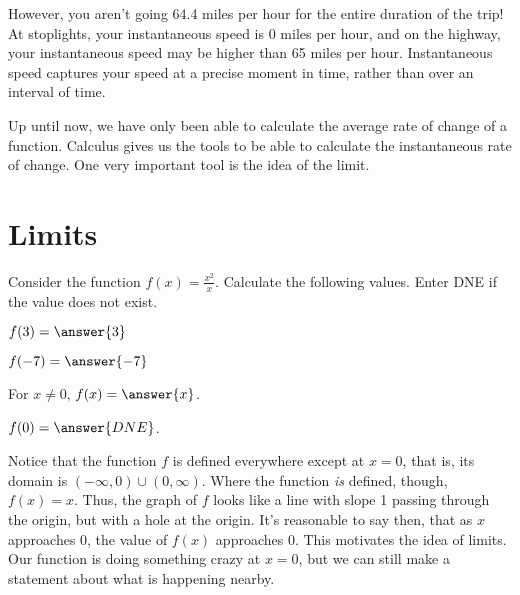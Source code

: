 \documentclass{ximera}
\begin{document}
However, you aren't going 64.4 miles per hour for the entire duration of the trip! At stoplights, your instantaneous speed is 0 miles per hour, and on the highway, your instantaneous speed may be higher than 65 miles per hour. Instantaneous speed captures your speed at a precise moment in time, rather than over an interval of time. 

Up until now, we have only been able to calculate the average rate of change of a function. Calculus gives us the tools to be able to calculate the instantaneous rate of change. One very important tool is the idea of the limit. 

\section{Limits}
\begin{problem}
Consider the function $f(x) = \frac{x^2}{x}$. Calculate the following values. Enter DNE if the value does not exist.

$f(3) = \answer{3}$

$f(-7) = \answer{-7}$

For $x \ne 0$, $f(x) = \answer{x}$.

$f(0) = \answer{DNE}$.
\end{problem}

Notice that the function $f$ is defined everywhere except at $x = 0$, that is, its domain is $(-\infty, 0) \cup (0, \infty)$. Where the function \emph{is} defined, though, $f(x) = x$. Thus, the graph of $f$ looks like a line with slope 1 passing through the origin, but with a hole at the origin. It's reasonable to say then, that as $x$ approaches 0, the value of $f(x)$ approaches 0. This motivates the idea of limits. Our function is doing something crazy at $x = 0$, but we can still make a statement about what is happening nearby. 
\end{document}
